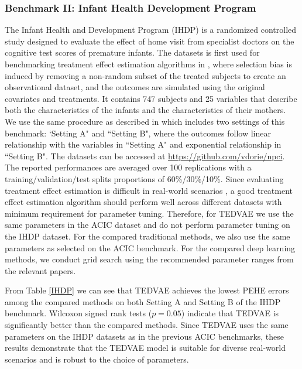 \documentclass[letterpaper]{article} %
\begin{document}
\subsubsection{Benchmark II: Infant Health Development Program}
The Infant Health and Development Program (IHDP) is a randomized controlled study designed to evaluate the effect of home visit from specialist doctors on the cognitive test scores of premature infants.
The datasets is first used for benchmarking treatment effect estimation algorithms in \cite{Hill2011}, where selection bias is induced by removing a non-random subset of the treated subjects to create an observational dataset, and the outcomes are simulated using the original covariates and treatments.
It contains 747 subjects and 25 variables that describe both the characteristics of the infants and the characteristics of their mothers.
We use the same procedure as described in \cite{Hill2011} which includes two settings of this benchmark: `Setting A" and ``Setting B", where the outcomes follow linear relationship with the variables in ``Setting A" and exponential relationship in ``Setting B". The datasets can be accessed at \url{https://github.com/vdorie/npci}.
The reported performances are averaged over 100 replications with a training/validation/test splits proportions of 60\%/30\%/10\%.  Since evaluating treatment effect estimation is difficult in real-world scenarios \cite{Alaa2019}, a good treatment effect estimation algorithm should perform well across different datasets with minimum requirement for parameter tuning.
Therefore, for TEDVAE we use the same parameters in the ACIC dataset and do not perform parameter tuning on the IHDP dataset.
For the compared traditional methods, we also use the same parameters as selected on the ACIC benchmark. For the compared deep learning methods, we conduct grid search using the recommended parameter ranges from the relevant papers.

From Table \ref{IHDP} we can see that TEDVAE achieves the lowest PEHE errors among the compared methods on both Setting A and Setting B of the IHDP benchmark. Wilcoxon signed rank tests ($p=0.05$) indicate that TEDVAE is significantly better than the compared methods.
Since TEDVAE uses the same parameters on the IHDP datasets as in the previous ACIC benchmarks,  these results demonstrate that the TEDVAE model is suitable for diverse real-world scenarios and is robust to the choice of parameters.
\end{document}
